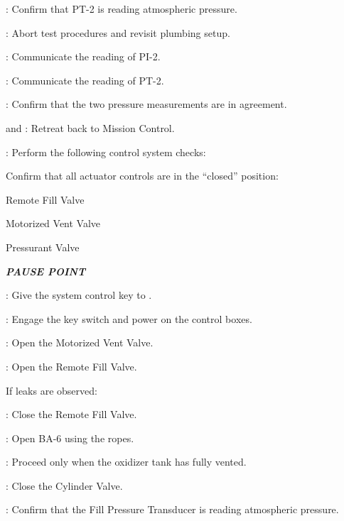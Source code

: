 \begin{checklist}
\begin{checklist}[label=$\bullet$]
\begin{checklist}
            \item \daq{}: Confirm that PT-2 is reading atmospheric pressure.
            \item \ops{}: Abort test procedures and revisit plumbing setup.
        \end{checklist}
    \end{checklist}
    \item \primary{}: Communicate the reading of PI-2.
    \item \daq{}: Communicate the reading of PT-2.
    \item \daq{}: Confirm that the two pressure measurements are in agreement.
    \item \primary{} and \secondary{}: Retreat back to Mission Control.
    \item \control{}: Perform the following control system checks:
    \begin{checklist}
        \item Confirm that all actuator controls are in the ``closed'' position:
        \begin{checklist}
            \item Remote Fill Valve
            \item Motorized Vent Valve
            \item Pressurant Valve
        \end{checklist}
    \end{checklist}
    \item \textbf{\textit{PAUSE POINT}}
    \item \ops: Give the system control key to \control{}.
    \item \control{}: Engage the key switch and power on the control boxes.
    \item \control{}: Open the Motorized Vent Valve.
    \item \control{}: Open the Remote Fill Valve.
    \begin{checklist}[label=$\bullet$]
        \item If leaks are observed:
        \begin{checklist}
            \item \control{}: Close the Remote Fill Valve.
            \item \primary{}: Open BA-6 using the ropes.
            \item \ops: Proceed only when the oxidizer tank has fully vented.
            \item \primary{}: Close the Cylinder Valve.
            \item \daq{}: Confirm that the Fill Pressure Transducer is reading atmospheric pressure.

\end{checklist}
\end{checklist}
\end{checklist}
